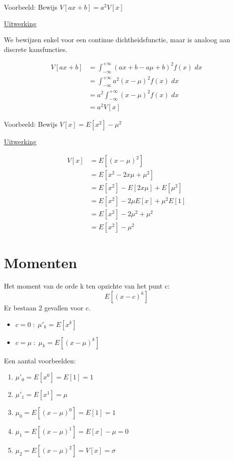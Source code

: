 \documentclass[12pt]{report}
\newcommand{\example}[2]{
      \hrulefill
      
      Voorbeeld: #1
      
      \underline{Uitwerking}
      
      #2
      
      \hrulefill
  }
\begin{document}
\example{Bewijs $V[ax + b] = a^2V[x]$}{
We bewijzen enkel voor een continue dichtheidsfunctie, maar is analoog aan discrete kansfuncties.

\begin{equation*}
 \begin{split}
  V[ax + b] & = \int_{-\infty}^{+\infty}(ax + b - a\mu + b)^2 f(x)\; dx \\
            & = \int_{-\infty}^{+\infty}a^2(x - \mu)^2 f(x)\; dx \\
            & = a^2\int_{-\infty}^{+\infty}(x - \mu)^2 f(x)\; dx \\
            & = a^2V[x]
 \end{split}
\end{equation*}
}
\example{Bewijs $V[x] = E[x^2] - \mu^2$}{
\begin{equation*}
 \begin{split}
  V[x] & = E[(x - \mu)^2] \\
       & = E[x^2 - 2x\mu + \mu^2] \\
       & = E[x^2] - E[2x\mu] + E[\mu^2] \\
       & = E[x^2] - 2\mu E[x] + \mu^2E[1] \\
       & = E[x^2] - 2\mu^2 + \mu^2 \\
       & = E[x^2] - \mu^2
 \end{split}
\end{equation*}


}

\section{Momenten}
Het moment van de orde k ten opzichte van het punt c:
$$E[(x - c)^k]$$
Er bestaan 2 gevallen voor c.
\begin{itemize}
 \item $c = 0\;:\; \mu'_{k} = E[x^k]$
 \item $c = \mu \;:\; \mu_k = E[(x - \mu)^k]$
\end{itemize}
Een aantal voorbeelden:
\begin{enumerate}
 \item $\mu'_0 = E[x^0] = E[1] = 1$
 \item $\mu'_1 = E[x^1] = \mu$
 \item $\mu_0 = E[(x - \mu)^0] = E[1] = 1$
 \item $\mu_1 = E[(x - \mu)^1] = E[x] - \mu = 0$
 \item $\mu_2 = E[(x - \mu)^2] = V[x] = \sigma$
\end{enumerate}
\end{document}
